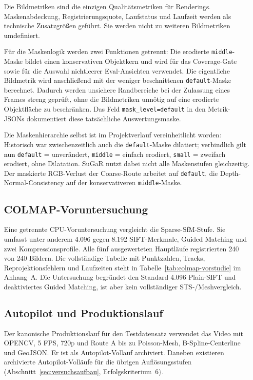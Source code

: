 Die Bildmetriken sind die einzigen Qualitätsmetriken für Renderings.
Maskenabdeckung, Registrierungsquote, Laufstatus und Laufzeit werden als
technische Zusatzgrößen geführt. Sie werden nicht zu weiteren Bildmetriken
umdefiniert.

Für die Maskenlogik werden zwei Funktionen getrennt: Die erodierte
\texttt{middle}-Maske bildet einen konservativen Objektkern und wird für das
Coverage-Gate sowie für die Auswahl nichtleerer Eval-Ansichten verwendet. Die
eigentliche Bildmetrik wird anschließend mit der weniger beschnittenen
\texttt{default}-Maske berechnet. Dadurch werden unsichere Randbereiche bei
der Zulassung eines Frames streng geprüft, ohne die Bildmetriken unnötig auf
eine erodierte Objektfläche zu beschränken. Das Feld
\texttt{mask\_level=default} in den Metrik-JSONs dokumentiert diese tatsächliche
Auswertungsmaske.

Die Maskenhierarchie selbst ist im Projektverlauf vereinheitlicht worden:
Historisch war zwischenzeitlich auch die \texttt{default}-Maske dilatiert;
verbindlich gilt nun \texttt{default} = unverändert, \texttt{middle} = einfach
erodiert, \texttt{small} = zweifach erodiert, ohne Dilatation. SuGaR nutzt
dabei nicht alle Maskenstufen gleichzeitig. Der maskierte RGB-Verlust der
Coarse-Route arbeitet auf \texttt{default}, die Depth-Normal-Consistency auf
der konservativeren \texttt{middle}-Maske.

\subsection{COLMAP-Voruntersuchung}

Eine getrennte CPU-Voruntersuchung vergleicht die Sparse-SfM-Stufe. Sie umfasst
unter anderem 4.096 gegen 8.192 SIFT-Merkmale, Guided Matching und zwei
Kompressionsprofile. Alle fünf ausgewerteten Hauptläufe registrierten 240 von
240 Bildern. Die vollständige Tabelle mit Punktzahlen, Tracks,
Reprojektionsfehlern und Laufzeiten steht in
Tabelle~\ref{tab:colmap-vorstudie} im Anhang~A. Die Untersuchung begründet den Standard
4.096 Plain-SIFT und deaktiviertes Guided Matching, ist aber kein
vollständiger STS-/Meshvergleich.

\subsection{Autopilot und Produktionslauf}

Der kanonische Produktionslauf für den Testdatensatz verwendet das Video
 mit OPENCV, 5 FPS, 720p und Route A bis zu Poisson-Mesh,
B-Spline-Centerline und GeoJSON. Er ist als Autopilot-Vollauf archiviert.
Daneben existieren archivierte Autopilot-Volläufe für die übrigen
Auflösungsstufen (Abschnitt~\ref{sec:versuchsaufbau}, Erfolgskriterium~6).

